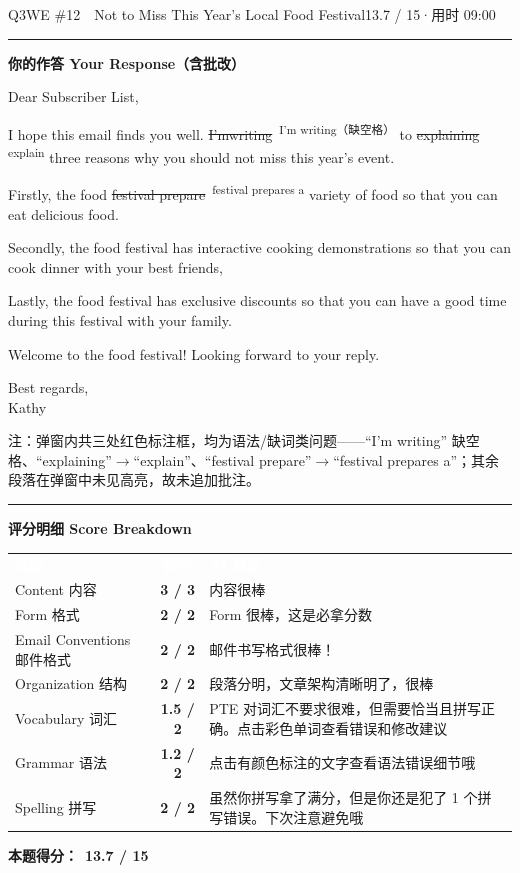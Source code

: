 \documentclass[11pt]{article}
\newcommand{\fix}[2]{%
  \colorbox{cWrongBg}{\textcolor{cWrong}{\sout{#1}}}%
  \,\textsuperscript{\textcolor{cFix}{\footnotesize #2}}}
\newcommand{\sfull}[1]{\textcolor{cFix}{\bfseries #1}}     %
\newcommand{\spart}[1]{\textcolor{cPartial}{\bfseries #1}} %
\newcommand{\ptesub}[1]{%
  \par\needspace{2\baselineskip}\smallskip
  {\color{cAccent}\rule[-0.2ex]{3pt}{1.05em}}\hspace{6pt}%
  {\bfseries\color{cHead}#1}\par\nopagebreak\smallskip}
\newcommand{\scorehead}{%
  \rowcolors{2}{cGrayBox}{white}
  \arrayrulecolor{cRule}}
\begin{document}
\begin{qblock}{Q3\quad WE \#12\ \ Not to Miss This Year's Local Food Festival}{13.7 / 15\quad·\quad 用时 09:00}
\ptesub{你的作答 Your Response（含批改）}
\begin{youbox}
Dear Subscriber List,

I hope this email finds you well. \fix{I'mwriting}{I'm writing（缺空格）} to \fix{explaining}{explain} three reasons why you should not miss this year's event.

Firstly, the food \fix{festival prepare}{festival prepares a} variety of food so that you can eat delicious food.

Secondly, the food festival has interactive cooking demonstrations so that you can cook dinner with your best friends,

Lastly, the food festival has exclusive discounts so that you can have a good time during this festival with your family.

Welcome to the food festival! Looking forward to your reply.

Best regards,\\ Kathy
\end{youbox}
{\footnotesize\color{gray} 注：弹窗内共三处红色标注框，均为语法/缺词类问题——``I'm writing'' 缺空格、``explaining''$\to$``explain''、``festival prepare''$\to$``festival prepares a''；其余段落在弹窗中未见高亮，故未追加批注。}

\ptesub{评分明细 Score Breakdown}
{\small\scorehead
\begin{tabularx}{\linewidth}{l c Y}
\textcolor{white}{\bfseries 维度} & \textcolor{white}{\bfseries 得分} & \textcolor{white}{\bfseries AI 建议}\\
Content 内容              & \sfull{3 / 3}   & 内容很棒\\
Form 格式                & \sfull{2 / 2}   & Form 很棒，这是必拿分数\\
Email Conventions 邮件格式 & \sfull{2 / 2}   & 邮件书写格式很棒！\\
Organization 结构         & \sfull{2 / 2}   & 段落分明，文章架构清晰明了，很棒\\
Vocabulary 词汇           & \spart{1.5 / 2} & PTE 对词汇不要求很难，但需要恰当且拼写正确。点击彩色单词查看错误和修改建议\\
Grammar 语法              & \spart{1.2 / 2} & 点击有颜色标注的文字查看语法错误细节哦~\\
Spelling 拼写             & \sfull{2 / 2}   & 虽然你拼写拿了满分，但是你还是犯了 1 个拼写错误。下次注意避免哦\\
\end{tabularx}}
\smallskip
\textbf{本题得分：}\ {\color{cAccent}\bfseries 13.7 / 15}

\end{qblock}
\end{document}
